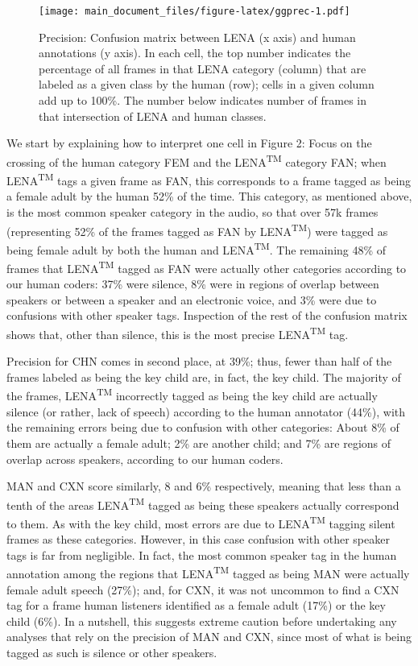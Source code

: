 \documentclass[english,floatsintext,man]{apa6}
\begin{document}
\begin{figure}
\centering
\texttt{[image: main\_document\_files/figure-latex/ggprec-1.pdf]}
\caption{\label{fig:ggprec}Precision: Confusion matrix between LENA (x axis)
and human annotations (y axis). In each cell, the top number indicates
the percentage of all frames in that LENA category (column) that are
labeled as a given class by the human (row); cells in a given column add
up to 100\%. The number below indicates number of frames in that
intersection of LENA and human classes.}
\end{figure}

We start by explaining how to interpret one cell in Figure 2: Focus on
the crossing of the human category FEM and the LENA\textsuperscript{TM}
category FAN; when LENA\textsuperscript{TM} tags a given frame as FAN,
this corresponds to a frame tagged as being a female adult by the human
52\% of the time. This category, as mentioned above, is the most common
speaker category in the audio, so that over 57k frames (representing
52\% of the frames tagged as FAN by LENA\textsuperscript{TM}) were
tagged as being female adult by both the human and
LENA\textsuperscript{TM}. The remaining 48\% of frames that
LENA\textsuperscript{TM} tagged as FAN were actually other categories
according to our human coders: 37\% were silence, 8\% were in regions of
overlap between speakers or between a speaker and an electronic voice,
and 3\% were due to confusions with other speaker tags. Inspection of
the rest of the confusion matrix shows that, other than silence, this is
the most precise LENA\textsuperscript{TM} tag.

Precision for CHN comes in second place, at 39\%; thus, fewer than half
of the frames labeled as being the key child are, in fact, the key
child. The majority of the frames, LENA\textsuperscript{TM} incorrectly
tagged as being the key child are actually silence (or rather, lack of
speech) according to the human annotator (44\%), with the remaining
errors being due to confusion with other categories: About 8\% of them
are actually a female adult; 2\% are another child; and 7\% are regions
of overlap across speakers, according to our human coders.

MAN and CXN score similarly, 8 and 6\% respectively, meaning that less
than a tenth of the areas LENA\textsuperscript{TM} tagged as being these
speakers actually correspond to them. As with the key child, most errors
are due to LENA\textsuperscript{TM} tagging silent frames as these
categories. However, in this case confusion with other speaker tags is
far from negligible. In fact, the most common speaker tag in the human
annotation among the regions that LENA\textsuperscript{TM} tagged as
being MAN were actually female adult speech (27\%); and, for CXN, it was
not uncommon to find a CXN tag for a frame human listeners identified as
a female adult (17\%) or the key child (6\%). In a nutshell, this
suggests extreme caution before undertaking any analyses that rely on
the precision of MAN and CXN, since most of what is being tagged as such
is silence or other speakers.
\end{document}
